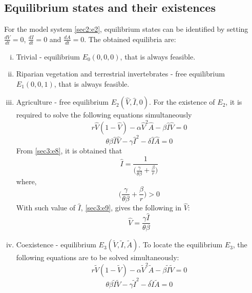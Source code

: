\documentclass[12pt]{article}
\numberwithin{equation}{section}
\begin{document}
\subsection{Equilibrium states and their existences}
For the model system \eqref{sec2:e2}, equilibrium states can be identified by setting $\frac{dV}{dt}=0$, $\frac{dI}{dt}=0$ and $\frac{dA}{dt}=0$. The obtained equilibria are:
\begin{enumerate}[i)]
\item Trivial - equilibrium $E_0(0,0,0)$, that is always feasible.
\item Riparian vegetation and terrestrial invertebrates - free equilibrium $E_1(0,0,1)$, that is always feasible.
\item Agriculture - free equilibrium $E_2(\hat V, \hat I, 0)$. For the existence of $E_2$, it is required to solve the following equations simultaneously
\begin{equation}\label{sec3:e8}
r \hat V(1- \hat V)-\alpha \hat V^2 \hat A - \beta \hat I \hat V=0
\end{equation}
\begin{equation}\label{sec3:e9}
\theta \beta \hat I \hat V - \gamma \hat I^2 - \delta \hat I \hat A=0
\end{equation}
From \eqref{sec3:e8}, it is obtained that
\begin{equation}\label{sec3:e10}
\hat I=\frac{1}{\bigg( \frac{\gamma}{\theta \beta} + \frac{\beta}{r}\bigg)}
\end{equation}
where,
\begin{equation}\label{sec3:e11}
\bigg( \frac{\gamma}{\theta \beta} + \frac{\beta}{r}\bigg) > 0
\end{equation}
With such value of $\hat I$, \eqref{sec3:e9}, gives the following in $\hat V$:
\begin{equation}\label{sec3:e12}
\hat V = \frac{\gamma \hat I}{\theta \beta}
\end{equation}
\item Coexistence - equilibrium $E_3 (\tilde V, \tilde I, \tilde A)$. To locate the equilibrium $E_3$, the following equations are to be solved simultaneously:
\begin{equation}\label{sec3:e13}
r\tilde V(1- \tilde V)-\alpha \tilde V^2 \tilde A - \beta \tilde I \tilde V=0
\end{equation}
\begin{equation}\label{sec3:e14}
\theta \beta \tilde I \tilde V - \gamma \tilde I^2 - \delta \tilde I \tilde A=0
\end{equation}

\end{enumerate}
\end{document}
